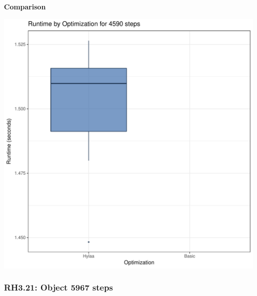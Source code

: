 \documentclass{article}\usepackage[]{graphicx}\usepackage[]{color}
\makeatletter
\def\maxwidth{ %
  \ifdim\Gin@nat@width>\linewidth
    \linewidth
  \else
    \Gin@nat@width
  \fi
}
\newenvironment{knitrout}{}{} %
\makeatother
\begin{document}
 \textbf{Comparison}
  
\begin{knitrout}
\color{fgcolor}
\includegraphics[width=\maxwidth]{figure/RH3_steps4590-1} 

\end{knitrout}


\subsubsection{RH3.21: Object 5967 steps}
\end{document}
